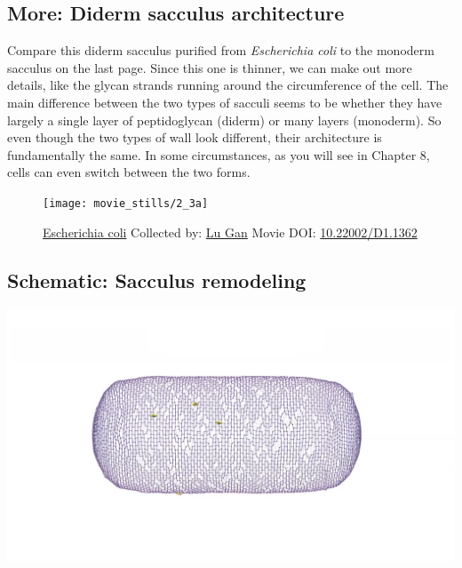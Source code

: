 \documentclass[]{tufte-book}
\begin{document}
\hypertarget{Diderm_sacculus_architecture}{\subsection*{More: Diderm
sacculus architecture}\label{Diderm_sacculus_architecture}}

Compare this diderm sacculus purified from \emph{Escherichia coli} to
the monoderm sacculus on the last page. Since this one is thinner, we
can make out more details, like the glycan strands running around the
circumference of the cell. The main difference between the two types of
sacculi seems to be whether they have largely a single layer of
peptidoglycan (diderm) or many layers (monoderm). So even though the two
types of wall look different, their architecture is fundamentally the
same. In some circumstances, as you will see in Chapter 8, cells can
even switch between the two forms.





\begin{figure}
\texttt{[image: movie\_stills/2\_3a]} \caption[\protect\hyperlink{tree}{Escherichia coli} Collected by:
\protect\hyperlink{lu_gan}{Lu Gan} Movie DOI:
\href{https://doi.org/10.22002/D1.1362}{10.22002/D1.1362}]{\protect\hyperlink{tree}{Escherichia coli} Collected by:
\protect\hyperlink{lu_gan}{Lu Gan} Movie DOI:
\href{https://doi.org/10.22002/D1.1362}{10.22002/D1.1362}}\label{fig:2-3a}
\end{figure}

\hypertarget{Sacculus_remodeling}{\subsection*{Schematic: Sacculus
remodeling}\label{Sacculus_remodeling}}

\includegraphics{img/schematics/2_3_2}
\end{document}
